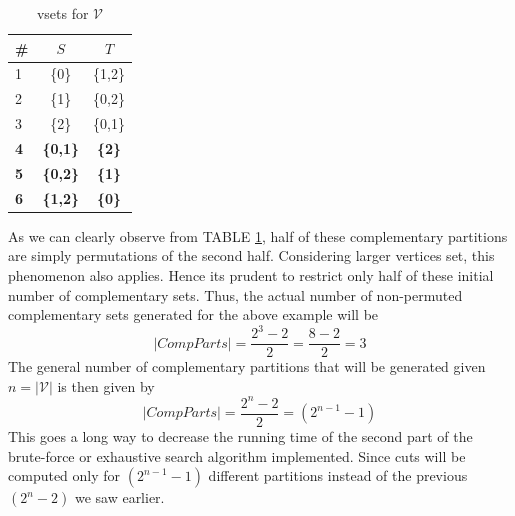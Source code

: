 \documentclass[longpaper, english, final, times]{revdetua}
\begin{document}
			\begin{table}[!h]
				\caption{vsets for $\mathcal{V}$}
				\label{table:VSetsExample1}
				\begin{center}
					\begin{tabular}{lcc}
						\toprule
						\# & $S$ & $T$ \\
						\midrule
						1 & \{0\} & \{1,2\} \\
						2 & \{1\} & \{0,2\} \\
						3 & \{2\} & \{0,1\} \\
						\hdashline
						\textbf{4} & \textbf{\{0,1\}} & \textbf{\{2\}} \\
						\textbf{5} & \textbf{\{0,2\}} & \textbf{\{1\}} \\
						\textbf{6} & \textbf{\{1,2\}} & \textbf{\{0\}} \\
						\bottomrule
					\end{tabular}
				\end{center}
			\end{table}		
			
			As we can clearly observe from TABLE \ref{table:VSetsExample1}, half of these complementary partitions are simply permutations of the second half. Considering larger vertices set, this phenomenon also applies. Hence its prudent to restrict only half of these initial number of complementary sets. Thus, the actual number of non-permuted complementary sets generated for the above example will be $$|CompParts|=\frac{2^3-2}{2}=\frac{8-2}{2}=3$$
			The general number of complementary partitions that will be generated given $n=|\mathcal{V}|$ is then given by $$|CompParts|=\frac{2^n-2}{2}=(2^{n-1}-1)$$
			This goes a long way to decrease the running time of the second part of the brute-force or exhaustive search algorithm implemented. Since cuts will be computed only for $(2^{n-1}-1)$ different partitions instead of the previous $(2^{n}-2)$ we saw earlier.
	
\end{document}
